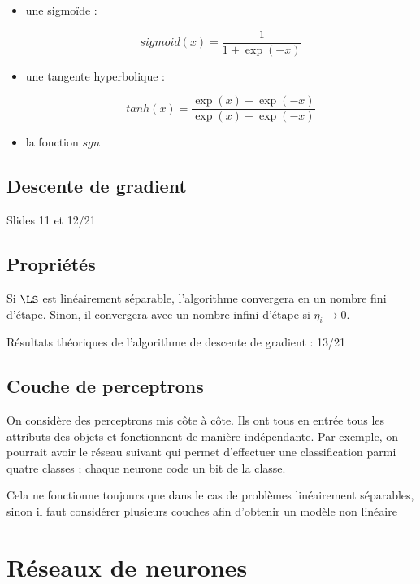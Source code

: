 	\begin{itemize}
		\item une sigmoïde :
		
		$$sigmoid(x) = \frac{1}{1 + \exp(-x)}$$
		
		
		\item une tangente hyperbolique :
		
		$$tanh(x) = \frac{\exp(x) - \exp(-x)}{\exp(x) + \exp(-x)}$$
		
		
		\item la fonction $sgn$
		
		
	\end{itemize}
	
	\subsection{Descente de gradient}
	
	Slides 11 et 12/21
	
	\subsection{Propriétés}
	
	Si $\LS$ est linéairement séparable, l'algorithme convergera en un nombre fini d'étape. Sinon, il convergera avec un nombre infini d'étape si $\eta_i \rightarrow 0$.
	
	Résultats théoriques de l'algorithme de descente de gradient : 13/21
	
	\subsection{Couche de perceptrons}
	
	On considère des perceptrons mis côte à côte. Ils ont tous en entrée tous les attributs des objets et fonctionnent de manière indépendante. Par exemple, on pourrait avoir le réseau suivant qui permet d'effectuer une classification parmi quatre classes ; chaque neurone code un bit de la classe.
	
	
	Cela ne fonctionne toujours que dans le cas de problèmes linéairement séparables, sinon il faut considérer plusieurs couches afin d'obtenir un modèle non linéaire

\section{Réseaux de neurones}


